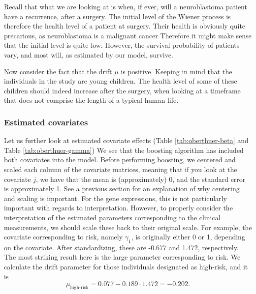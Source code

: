 Recall that what we are looking at is when, if ever, will a neuroblastoma patient have a recurrence, after a surgery.
The initial level of the Wiener process is therefore the health level of a patient at surgery.
Their health is obviously quite precarious, as neuroblastoma is a malignant cancer
Therefore it might make sense that the initial level is quite low.
However, the survival probability of patients vary, and most will, as estimated by our model, survive.

Now consider the fact that the drift $\mu$ is positive.
Keeping in mind that the individuals in the study are young children.
The health level of some of these children should indeed increase after the surgery, when looking at a timeframe that does not comprise the length of a typical human life.

\subsubsection{Estimated covariates}
Let us further look at estimated covariate effects (Table \ref{tab:oberthuer-beta} and Table \ref{tab:oberthuer-gamma})
We see that the boosting algorithm has included both covariates into the model.
Before performing boosting, we centered and scaled each column of the covariate matrices, meaning that if you look at the covariate $j$, we have that the mean is (approximately) 0,
and the standard error is approximately 1.
See a previous section for an explanation of why centering and scaling is important.
For the gene expressions, this is not particularly important with regards to interpretation.
However, to properly consider the interpretation of the estimated parameters corresponding to the clinical measurements, we should
scale these back to their original scale.
For example, the covariate corresponding to risk, namely $\gamma_1$, is originally either 0 or 1, depending on the covariate.
After standardizing, these are -0.677 and 1.472, respectively.
The most striking result here is the large parameter corresponding to risk.
We calculate the drift parameter for those individuals designated as high-risk, and it is
\begin{equation}
    \mu_{\text{high-risk}}=0.077-0.189\cdot1.472=-0.202.
\end{equation}
